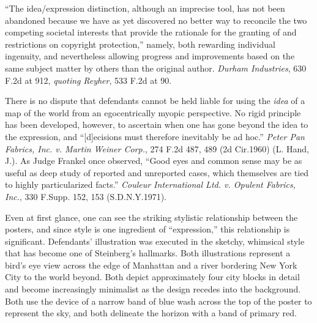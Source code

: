 ``The idea/expression distinction, although an imprecise tool, has not been
abandoned because we have as yet discovered no better way to reconcile the two
competing societal interests that provide the rationale for the granting of and
restrictions on copyright protection,'' namely, both rewarding individual
ingenuity, and nevertheless allowing progress and improvements based on the same
subject matter by others than the original author. \textit{Durham Industries},
630 F.2d at 912, \textit{quoting} \textit{Reyher}, 533 F.2d at 90.

There is no dispute that defendants cannot be held liable for using the
\textit{idea} of a map of the world from an egocentrically myopic perspective.
No rigid principle has been developed, however, to ascertain when one has gone
beyond the idea to the expression, and ``[d]ecisions must therefore inevitably
be ad hoc.'' \textit{Peter Pan Fabrics, Inc. v. Martin Weiner Corp.}, 274 F.2d
487, 489 (2d Cir.1960) (L. Hand, J.). As Judge Frankel once observed, ``Good
eyes and common sense may be as useful as deep study of reported and unreported
cases, which themselves are tied to highly particularized facts.''
\textit{Couleur International Ltd. v. Opulent Fabrics, Inc.}, 330 F.Supp. 152,
153 (S.D.N.Y.1971).

Even at first glance, one can see the striking stylistic relationship between
the posters, and since style is one ingredient of ``expression,'' this
relationship is significant. Defendants' illustration was executed in the
sketchy, whimsical style that has become one of Steinberg's hallmarks. Both
illustrations represent a bird's eye view across the edge of Manhattan and a
river bordering New York City to the world beyond. Both depict approximately
four city blocks in detail and become increasingly minimalist as the design
recedes into the background. Both use the device of a narrow band of blue wash
across the top of the poster to represent the sky, and both delineate the
horizon with a band of primary red.

